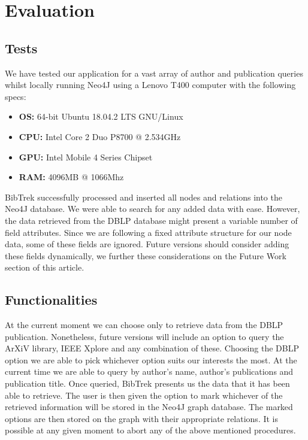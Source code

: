 \documentclass{article}
\begin{document}
\section{Evaluation}
\subsection{Tests}
We have tested our application for a vast array of author and publication queries whilst locally running Neo4J using a Lenovo T400 computer with the following specs:
\begin{itemize}
\item \textbf{OS:} 64-bit Ubuntu 18.04.2 LTS GNU/Linux 
\item \textbf{CPU:} Intel Core 2 Duo P8700 @ 2.534GHz 
\item \textbf{GPU:} Intel Mobile 4 Series Chipset
\item \textbf{RAM:} 4096MB @ 1066Mhz 
\end{itemize}
BibTrek successfully processed and inserted all nodes and relations into the Neo4J database. We were able to search for any added data with ease. However, the data retrieved from the DBLP database might present a variable number of field attributes. Since we are following a fixed attribute structure for our node data, some of these fields are ignored. Future versions should consider adding these fields dynamically, we further these considerations on the Future Work section of this article.
\subsection{Functionalities}
At the current moment we can choose only to retrieve data from the DBLP publication. Nonetheless, future versions will include an option to query the ArXiV library, IEEE Xplore and any combination of these. Choosing the DBLP option we are able to pick whichever option suits our interests the most. At the current time we are able to query by author's name, author's publications and publication title. Once queried, BibTrek presents us the data that it has been able to retrieve. The user is then given the option to mark whichever of the retrieved information will be stored in the Neo4J graph database. The marked options are then stored on the graph with their appropriate relations. It is possible at any given moment to abort any of the above mentioned procedures.
\end{document}
